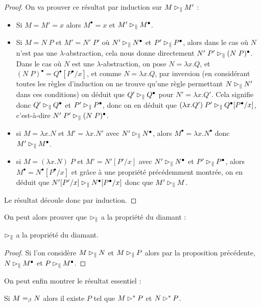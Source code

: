 \begin{proof}
    On va prouver ce résultat par induction sur $M\rhd_\| M'$ :
    \begin{itemize}[label=$\bullet$]
        \item Si $M = M' = x$ alors $M^\bullet = x$ et $M'\rhd_\| M^\bullet$.
        \item Si $M = N\;P$ et $M' = N'\;P'$ où $N'\rhd_\| N^\bullet$ et $P'\rhd_\| P^\bullet$, alors dans le cas où $N$ n'est pas une $\lambda$-abstraction, cela nous donne directement $N'\;P'\rhd_\| (N\;P)^\bullet$. Dans le cas où $N$ est une $\lambda$-abstraction, on pose $N = \lambda x.Q$, et $(N\;P)^\bullet = Q^\bullet[P^\bullet/x]$, et comme $N = \lambda x.Q$, par inversion (en considérant toutes les règles d'induction on ne trouve qu'une règle permettant $N\rhd_\| N'$ dans ces conditions) on déduit que $Q'\rhd_\| Q^\bullet$ pour $N' = \lambda x.Q'$. Cela signifie donc $Q'\rhd_\| Q^\bullet$ et $P'\rhd_\| P^\bullet$, donc on en déduit que $(\lambda x.Q')\;P'\rhd_\| Q^\bullet[P^\bullet/x]$, c'est-à-dire $N'\;P'\rhd_\| (N\;P)^\bullet$.
        \item si $M = \lambda x.N$ et $M' = \lambda x.N'$ avec $N'\rhd_\| N^\bullet$, alors $M^\bullet = \lambda x.N^\bullet$ donc $M'\rhd_\| M^\bullet$.
        \item si $M = (\lambda x.N)\;P$ et $M' = N'[P'/x]$ avec $N'\rhd_\| N^\bullet$ et $P'\rhd_\| P^\bullet$, alors $M^\bullet = N^\bullet[P^\bullet/x]$ et grâce à une propriété précédemment montrée, on en déduit que $N'[P'/x]\rhd_\| N^\bullet[P^\bullet/x]$ donc que $M'\rhd_\| M$.
    \end{itemize}
    Le résultat découle donc par induction.
\end{proof}

On peut alors prouver que $\rhd_\|$ a la propriété du diamant :

\begin{prop}
    $\rhd_\|$ a la propriété du diamant.
\end{prop}

\begin{proof}
    Si l'on considère $M\rhd_\| N$ et $M\rhd_\| P$ alors par la proposition précédente, $N\rhd_\| M^\bullet$ et $P\rhd_\| M^\bullet$.
\end{proof}

On peut enfin montrer le résultat essentiel :

\begin{them}
    Si $M=_\beta N$ alors il existe $P$ tel que $M\rhd^* P$ et $N\rhd^* P$.
\end{them}

